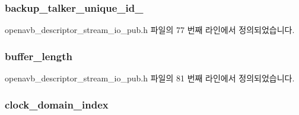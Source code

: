 \subsubsection[{\texorpdfstring{backup\+\_\+talker\+\_\+unique\+\_\+id\+\_\+2}{backup_talker_unique_id_2}}]{ backup\+\_\+talker\+\_\+unique\+\_\+id\+\_}\hypertarget{structopenavb__aem__descriptor__stream__io__t_a66a98efb2a77845482af4a00bba8599e}{}\label{structopenavb__aem__descriptor__stream__io__t_a66a98efb2a77845482af4a00bba8599e}


openavb\+\_\+descriptor\+\_\+stream\+\_\+io\+\_\+pub.\+h 파일의 77 번째 라인에서 정의되었습니다.

\subsubsection[{\texorpdfstring{buffer\+\_\+length}{buffer_length}}]{ buffer\+\_\+length}\hypertarget{structopenavb__aem__descriptor__stream__io__t_a47086525ce8f96ae8b84a7ad166ea3b3}{}\label{structopenavb__aem__descriptor__stream__io__t_a47086525ce8f96ae8b84a7ad166ea3b3}


openavb\+\_\+descriptor\+\_\+stream\+\_\+io\+\_\+pub.\+h 파일의 81 번째 라인에서 정의되었습니다.

\subsubsection[{\texorpdfstring{clock\+\_\+domain\+\_\+index}{clock_domain_index}}]{ clock\+\_\+domain\+\_\+index}\hypertarget{structopenavb__aem__descriptor__stream__io__t_a6bf82a91e71555466bdcba713002b1ff}{}\label{structopenavb__aem__descriptor__stream__io__t_a6bf82a91e71555466bdcba713002b1ff}


